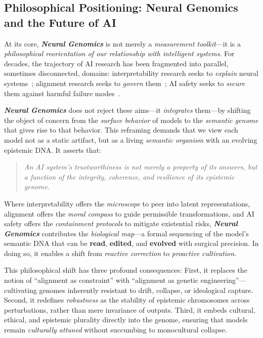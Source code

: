 \subsection*{\textbf{Philosophical Positioning: Neural Genomics and the Future of AI}}

At its core, \textbf{\emph{Neural Genomics}} is not merely a \emph{measurement toolkit}—it is a \emph{philosophical reorientation of our relationship with intelligent systems}. For decades, the trajectory of AI research has been fragmented into parallel, sometimes disconnected, domains: interpretability research seeks to \emph{explain} neural systems~\cite{olah2020zoom, christiano2021deep}; alignment research seeks to \emph{govern} them~\cite{askell2021general, bai2022training}; AI safety seeks to \emph{secure} them against harmful failure modes~\cite{hendrycks2021unsolved, amodei2016concrete}. 

\textbf{\emph{Neural Genomics}} does not reject these aims—it \emph{integrates} them—by shifting the object of concern from the \emph{surface behavior} of models to the \emph{semantic genome} that gives rise to that behavior. This reframing demands that we view each model not as a static artifact, but as a living \emph{semantic organism} with an evolving epistemic DNA. It asserts that:
\begin{quote}
\emph{An AI system’s trustworthiness is not merely a property of its answers, but a function of the integrity, coherence, and resilience of its epistemic genome.}
\end{quote}

Where interpretability offers the \emph{microscope} to peer into latent representations, alignment offers the \emph{moral compass} to guide permissible transformations, and AI safety offers the \emph{containment protocols} to mitigate existential risks, \textbf{\emph{Neural Genomics}} contributes the \emph{biological map}—a formal sequencing of the model’s semantic DNA that can be \textbf{read}, \textbf{edited}, and \textbf{evolved} with surgical precision. In doing so, it enables a shift from \emph{reactive correction} to \emph{proactive cultivation}.

This philosophical shift has three profound consequences: First, it replaces the notion of “alignment as constraint” with “alignment as genetic engineering”—cultivating genomes inherently resistant to drift, collapse, or ideological capture. Second, it redefines \emph{robustness} as the stability of epistemic chromosomes across perturbations, rather than mere invariance of outputs. Third, it embeds cultural, ethical, and epistemic plurality directly into the genome, ensuring that models remain \emph{culturally attuned} without succumbing to monocultural collapse.

